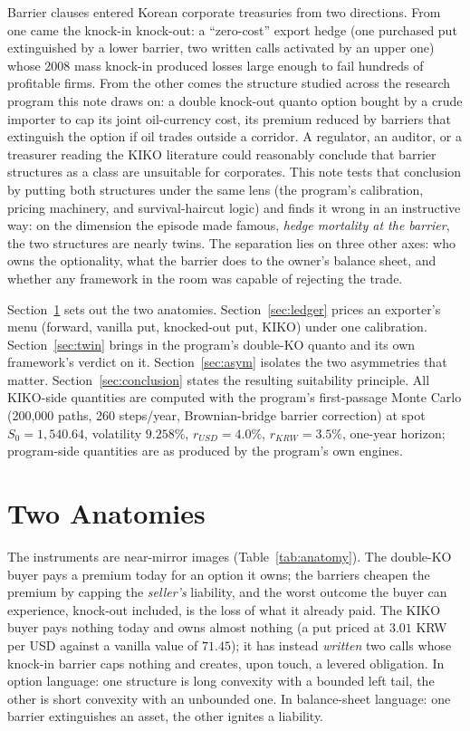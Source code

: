 \documentclass[11pt,a4paper]{article}
\begin{document}
Barrier clauses entered Korean corporate treasuries from two directions. From one came the knock-in knock-out: a ``zero-cost'' export hedge (one purchased put extinguished by a lower barrier, two written calls activated by an upper one) whose 2008 mass knock-in produced losses large enough to fail hundreds of profitable firms. From the other comes the structure studied across the research program this note draws on: a double knock-out quanto option bought by a crude importer to cap its joint oil-currency cost, its premium reduced by barriers that extinguish the option if oil trades outside a corridor. A regulator, an auditor, or a treasurer reading the KIKO literature could reasonably conclude that barrier structures as a class are unsuitable for corporates. This note tests that conclusion by putting both structures under the same lens (the program's calibration, pricing machinery, and survival-haircut logic) and finds it wrong in an instructive way: on the dimension the episode made famous, \emph{hedge mortality at the barrier}, the two structures are nearly twins. The separation lies on three other axes: who owns the optionality, what the barrier does to the owner's balance sheet, and whether any framework in the room was capable of rejecting the trade.

Section~\ref{sec:anatomy} sets out the two anatomies. Section~\ref{sec:ledger} prices an exporter's menu (forward, vanilla put, knocked-out put, KIKO) under one calibration. Section~\ref{sec:twin} brings in the program's double-KO quanto and its own framework's verdict on it. Section~\ref{sec:asym} isolates the two asymmetries that matter. Section~\ref{sec:conclusion} states the resulting suitability principle. All KIKO-side quantities are computed with the program's first-passage Monte Carlo (200{,}000 paths, 260 steps/year, Brownian-bridge barrier correction) at spot $S_0=1{,}540.64$, volatility $9.258\%$, $r_{USD}=4.0\%$, $r_{KRW}=3.5\%$, one-year horizon; program-side quantities are as produced by the program's own engines.

\section{Two Anatomies}
\label{sec:anatomy}

The instruments are near-mirror images (Table~\ref{tab:anatomy}). The double-KO buyer pays a premium today for an option it owns; the barriers cheapen the premium by capping the \emph{seller's} liability, and the worst outcome the buyer can experience, knock-out included, is the loss of what it already paid. The KIKO buyer pays nothing today and owns almost nothing (a put priced at $3.01$ KRW per USD against a vanilla value of $71.45$); it has instead \emph{written} two calls whose knock-in barrier caps nothing and creates, upon touch, a levered obligation. In option language: one structure is long convexity with a bounded left tail, the other is short convexity with an unbounded one. In balance-sheet language: one barrier extinguishes an asset, the other ignites a liability.
\end{document}
